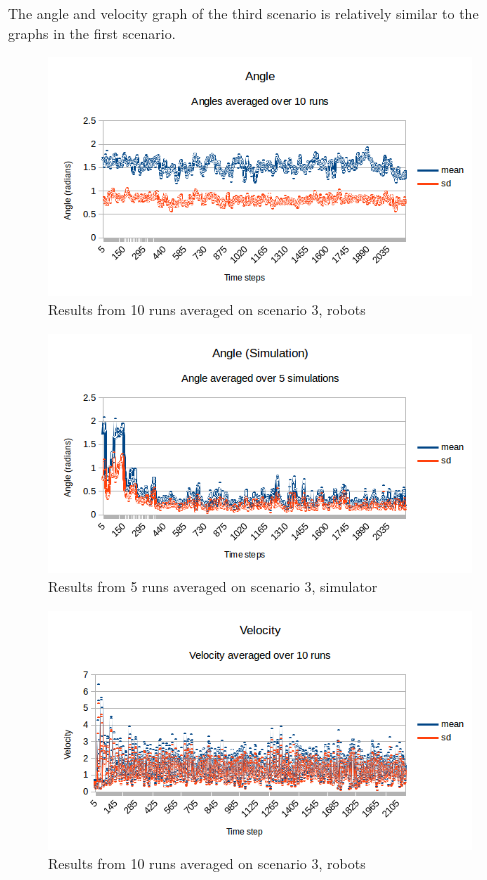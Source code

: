 The angle and velocity graph of the third scenario is relatively similar to the graphs in the first scenario.
\begin{figure}[h]
\begin{center}
\includegraphics[width=0.8\linewidth]{figs/runs/3pangle}
\end{center}
\caption[3. Angle, robots]{Results from 10 runs averaged on scenario 3, robots}
\label{fig:res3pang}
\end{figure}
\begin{figure}[h]
\begin{center}
\includegraphics[width=0.8\linewidth]{figs/runs/3sangle}
\end{center}
\caption[3. Angle, robots]{Results from 5 runs averaged on scenario 3, simulator}
\label{fig:res3sang}
\end{figure}
\begin{figure}[h]
\begin{center}
\includegraphics[width=0.8\linewidth]{figs/runs/3pvel}
\end{center}
\caption[3. Velocity, robots]{Results from 10 runs averaged on scenario 3, robots}
\label{fig:res3pvel}
\end{figure}

